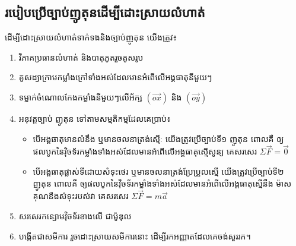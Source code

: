\subsection{របៀបប្រើច្បាប់ញូតុនដើម្បីដោះស្រាយលំហាត់}
\begin{key}
	ដើម្បីដោះស្រាយលំហាត់ទាក់ទងនិងច្បាប់ញូតុន យើងត្រូវ៖
	\begin{enumerate}
		\item វិភាគប្រធានលំហាត់ និងបាតុភូតរួចគូសរូប
		\item គូសដ្យាក្រាមកម្លាំងក្រៅទាំងអស់ដែលមានអំពើលើអង្គធាតុនីមួយៗ
		\item ទម្លាក់ចំណោលកែងកម្លាំងនីមួយៗលើអ័ក្ស $\left(\overrightarrow{ox}\right)$ និង $\left(\overrightarrow{oy}\right)$
		\item អនុវត្តច្បាប់ ញូតុន ទៅតាមសម្មតិកម្មដែលគេប្រាប់៖
		\begin{itemize}
			\item បើអង្គធាតុមានលំនឹង ឬមានចលនាត្រង់ស្មើៈ យើងត្រូវប្រើច្បាប់ទី១ ញូតុន ពោលគឺ ឲ្យផលបូកនៃវ៉ិចទ័រកម្លាំងទាំងអស់ដែលមានអំពើលើអង្គធាតុស្មើសូន្យ គេសរសេរ $\Sigma\vec{F}=\vec{0}$	
			\item បើអង្គធាតុផ្លាស់ទីដោយសំទុះថេរ ឬមានចលនាត្រង់ប្រែប្រួលស្មើ យើងត្រូវប្រើច្បាប់ទី២ ញូតុន ពោលគឺ ឲ្យផលបូកនៃវ៉ិចទ័រកម្លាំងទាំងអស់ដែលមានអំពើលើអង្គធាតុស្មើនឹង ម៉ាសគុណនឹងសំទុះរបស់វា គេសរសេរ $\Sigma \vec{F}=m\vec{a}$
		\end{itemize}
		\item សរសេរកន្សោមវ៉ិចទ័រខាងលើ ជាម៉ូឌុល
		\item បង្កើតជាសមីការ រួចដោះស្រាយសមីការនោះ ដើម្បីរកអញ្ញាតដែលគេចង់សួររក។
	\end{enumerate}
\end{key}

